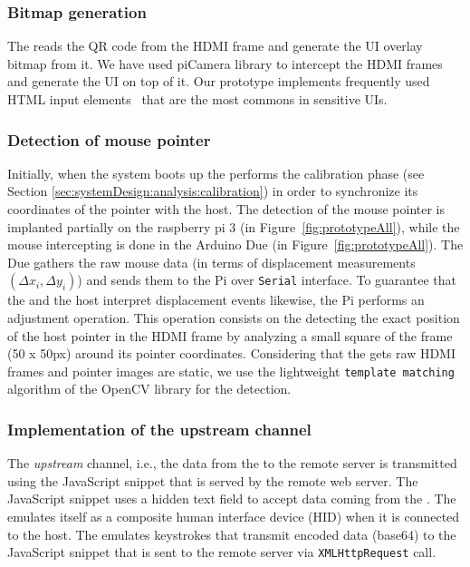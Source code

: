 \subsubsection{\bfseries Bitmap generation}
\label{sec:prototype:impl:bitmap}

The \device reads the QR code from the HDMI frame and generate the UI overlay bitmap from it. We have used piCamera library to intercept the HDMI frames and generate the UI on top of it. Our \name prototype implements frequently used HTML input elements~\cite{html_elements} that are the most commons in sensitive UIs. 

\subsubsection{\bfseries Detection of mouse pointer}
\label{sec:prototype:impl:mouse}

Initially, when the system boots up the \device performs the calibration phase (see Section \ref{sec:systemDesign:analysis:calibration}) in order to synchronize its coordinates of the pointer with the host. The detection of the mouse pointer is implanted partially on the raspberry pi 3 (\six in Figure~\ref{fig:prototypeAll}), while the mouse intercepting is done in the Arduino Due (\three in Figure~\ref{fig:prototypeAll}). The Due gathers the raw mouse data (in terms of displacement measurements $(\Delta x_i, \Delta y_i)$) and sends them to the Pi over \texttt{Serial} interface.  To guarantee that the \device and the host interpret displacement events likewise, the Pi performs an adjustment operation. This operation consists on the \device detecting the exact position of the host pointer in the HDMI frame by analyzing a small square of the frame (50 x 50px) around its pointer coordinates. Considering that the \device gets raw HDMI frames and pointer images are static, we use the lightweight \texttt{template matching} algorithm of the OpenCV library for the detection.

\subsubsection{\bfseries Implementation of the upstream channel}
\label{sec:prototype:impl:upstream}

 The \emph{upstream} channel, i.e., the data from the \device to the remote server is transmitted using the \name JavaScript snippet that is served by the remote web server. The \name JavaScript snippet uses a hidden text field to accept data coming from the \device. The \device emulates itself as a composite human interface device (HID) when it is connected to the host. The \device emulates keystrokes that transmit encoded data (base64) to the \name JavaScript snippet that is sent to the remote server via \texttt{XMLHttpRequest} call.





